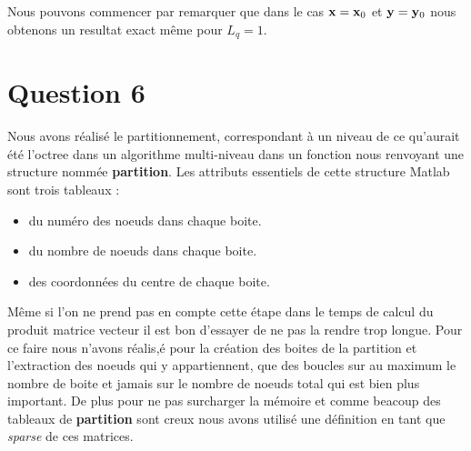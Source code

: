 \documentclass[10pt]{article}
\begin{document}
\begin{multicols}{2}

Nous pouvons commencer par remarquer que dans le cas ${\bf x}={\bf x}_0$ et ${\bf y}={\bf y}_0$ nous obtenons un resultat exact même pour $L_q=1$.  

\vspace*{22pt}


\section*{Question 6}

Nous avons réalisé le partitionnement, correspondant à un niveau de ce qu'aurait été l'octree dans un algorithme multi-niveau dans un fonction nous renvoyant une structure nommée \textbf{partition}. Les attributs essentiels de cette structure Matlab sont trois tableaux : \\

\begin{itemize}
\item du numéro des noeuds dans chaque boite. 
\item du nombre de noeuds dans chaque boite.
\item des coordonnées du centre de chaque boite. 
\end{itemize}

\vspace*{10pt}
Même si l'on ne prend pas en compte cette étape dans le temps de calcul du produit matrice vecteur il est bon d'essayer de ne pas la rendre trop longue. Pour ce faire nous n'avons réalis,é pour la création des boites de la partition et l'extraction des noeuds qui y appartiennent, que des boucles sur au maximum le nombre de boite et jamais sur le nombre de noeuds total qui est bien plus important. De plus pour ne pas surcharger la mémoire et comme beacoup des tableaux de \textbf{partition} sont creux nous avons utilisé une définition en tant que \textit{sparse} de ces matrices. \\




\end{multicols}
\end{document}
